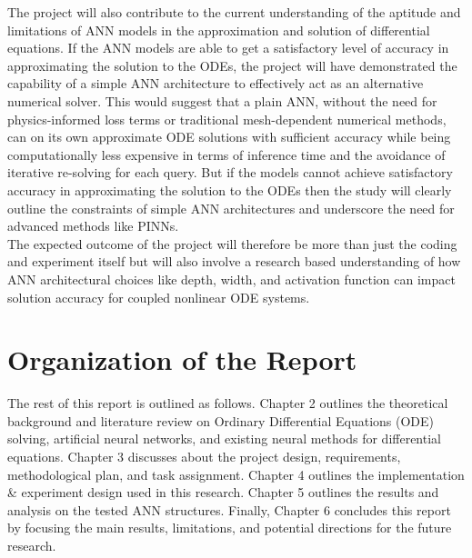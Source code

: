 The project will also contribute to the current understanding of the aptitude 
and limitations of ANN models in the approximation and solution of differential 
equations. If the ANN models are able to get a satisfactory level of accuracy in 
approximating the solution to the ODEs, the project will have demonstrated 
the capability of a simple ANN architecture to effectively act as an alternative 
numerical solver. This would suggest that a plain ANN, without the need for 
physics-informed loss terms or traditional mesh-dependent numerical 
methods, can on its own approximate ODE solutions with sufficient accuracy 
while being computationally less expensive in terms of inference time and the 
avoidance of iterative re-solving for each query. But if the models cannot 
achieve satisfactory accuracy in approximating the solution to the ODEs then 
the study will clearly outline the constraints of simple ANN architectures and 
underscore the need for advanced methods like PINNs. \\[1pt]

The expected outcome of the project will therefore be more than just the 
coding and experiment itself but will also involve a research based 
understanding of how ANN architectural choices like depth, width, and 
activation function can impact solution accuracy for coupled nonlinear ODE 
systems.


\section{Organization of the Report}
The rest of this report is outlined as follows. Chapter 2 outlines the theoretical 
background and literature review on Ordinary Differential Equations (ODE) 
solving, artificial neural networks, and existing neural methods for differential 
equations. Chapter 3 discusses about the project design, requirements, 
methodological plan, and task assignment. Chapter 4 outlines the 
implementation \& experiment design used in this research. Chapter 5 outlines 
the results and analysis on the tested ANN structures. Finally, Chapter 6 
concludes this report by focusing the main results, limitations, and potential 
directions for the future research. 
